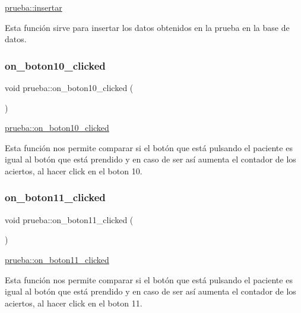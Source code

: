 \hyperlink{classprueba_ac7bf490420a1bd8080157ce2e2d6b78c}{prueba\+::insertar} 

Esta función sirve para insertar los datos obtenidos en la prueba en la base de datos. \mbox{\label{classprueba_a514abf87fbde22efc7ea3cba147e733c}} 
\subsubsection{\texorpdfstring{on\+\_\+boton10\+\_\+clicked}{on\_boton10\_clicked}}
{\footnotesize\ttfamily void prueba\+::on\+\_\+boton10\+\_\+clicked (\begin{DoxyParamCaption}{ }\end{DoxyParamCaption})\hspace{0.3cm}{\ttfamily [slot]}}



\hyperlink{classprueba_a514abf87fbde22efc7ea3cba147e733c}{prueba\+::on\+\_\+boton10\+\_\+clicked} 

Esta función nos permite comparar si el botón que está pulsando el paciente es igual al botón que está prendido y en caso de ser así aumenta el contador de los aciertos, al hacer click en el boton 10. \mbox{\label{classprueba_a332ffe63208038c15521b078581fbd24}} 
\subsubsection{\texorpdfstring{on\+\_\+boton11\+\_\+clicked}{on\_boton11\_clicked}}
{\footnotesize\ttfamily void prueba\+::on\+\_\+boton11\+\_\+clicked (\begin{DoxyParamCaption}{ }\end{DoxyParamCaption})\hspace{0.3cm}{\ttfamily [slot]}}



\hyperlink{classprueba_a332ffe63208038c15521b078581fbd24}{prueba\+::on\+\_\+boton11\+\_\+clicked} 

Esta función nos permite comparar si el botón que está pulsando el paciente es igual al botón que está prendido y en caso de ser así aumenta el contador de los aciertos, al hacer click en el boton 11. \mbox{\label{classprueba_a09d5326f33ef9cfafd86237e733c1093}} 
